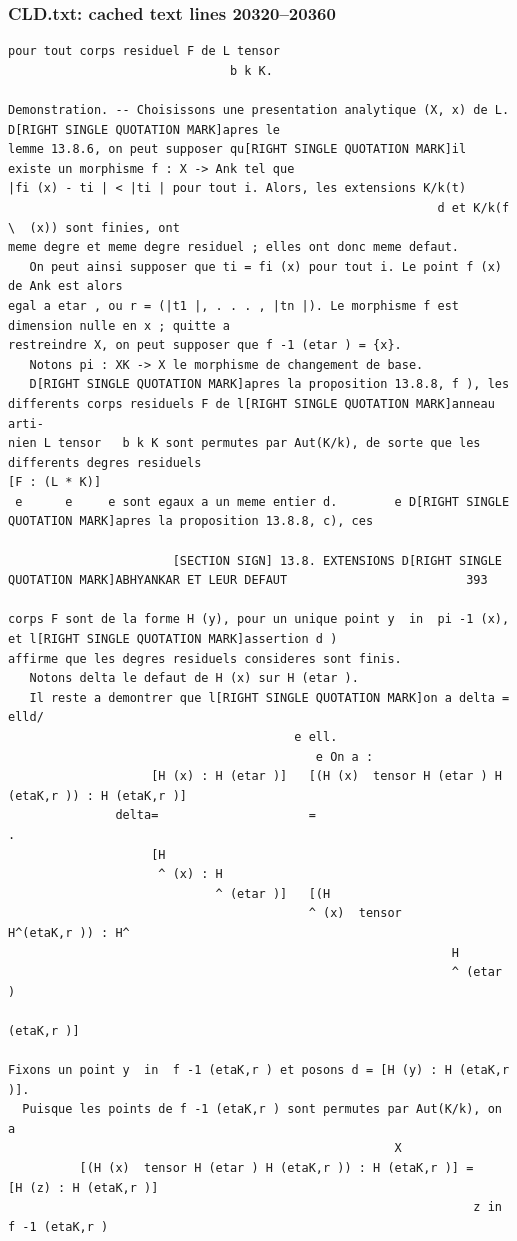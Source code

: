 \documentclass[
  11pt,
]{article}
\begin{document}
\subsubsection{CLD.txt: cached text lines
20320--20360}\label{cld.txt-cached-text-lines-2032020360}

\begin{lstlisting}
pour tout corps residuel F de L tensor 
                               b k K.

Demonstration. -- Choisissons une presentation analytique (X, x) de L. D[RIGHT SINGLE QUOTATION MARK]apres le
lemme 13.8.6, on peut supposer qu[RIGHT SINGLE QUOTATION MARK]il existe un morphisme f : X -> Ank tel que
|fi (x) - ti | < |ti | pour tout i. Alors, les extensions K/k(t)
                                                            d et K/k(f \  (x)) sont finies, ont
meme degre et meme degre residuel ; elles ont donc meme defaut.
   On peut ainsi supposer que ti = fi (x) pour tout i. Le point f (x) de Ank est alors
egal a etar , ou r = (|t1 |, . . . , |tn |). Le morphisme f est dimension nulle en x ; quitte a
restreindre X, on peut supposer que f -1 (etar ) = {x}.
   Notons pi : XK -> X le morphisme de changement de base.
   D[RIGHT SINGLE QUOTATION MARK]apres la proposition 13.8.8, f ), les differents corps residuels F de l[RIGHT SINGLE QUOTATION MARK]anneau arti-
nien L tensor   b k K sont permutes par Aut(K/k), de sorte que les differents degres residuels
[F : (L * K)]
 e      e     e sont egaux a un meme entier d.        e D[RIGHT SINGLE QUOTATION MARK]apres la proposition 13.8.8, c), ces

                       [SECTION SIGN] 13.8. EXTENSIONS D[RIGHT SINGLE QUOTATION MARK]ABHYANKAR ET LEUR DEFAUT                         393

corps F sont de la forme H (y), pour un unique point y  in  pi -1 (x), et l[RIGHT SINGLE QUOTATION MARK]assertion d )
affirme que les degres residuels consideres sont finis.
   Notons delta le defaut de H (x) sur H (etar ).
   Il reste a demontrer que l[RIGHT SINGLE QUOTATION MARK]on a delta = elld/
                                        e ell.
                                           e On a :
                    [H (x) : H (etar )]   [(H (x)  tensor H (etar ) H (etaK,r )) : H (etaK,r )]
               delta=                     =                                          .
                    [H
                     ^ (x) : H
                             ^ (etar )]   [(H
                                          ^ (x)  tensor         H^(etaK,r )) : H^
                                                              H
                                                              ^ (etar )
                                                                        (etaK,r )]

Fixons un point y  in  f -1 (etaK,r ) et posons d = [H (y) : H (etaK,r )].
  Puisque les points de f -1 (etaK,r ) sont permutes par Aut(K/k), on a
                                                      X
          [(H (x)  tensor H (etar ) H (etaK,r )) : H (etaK,r )] =        [H (z) : H (etaK,r )]
                                                                 z in f -1 (etaK,r )
\end{lstlisting}
\end{document}
